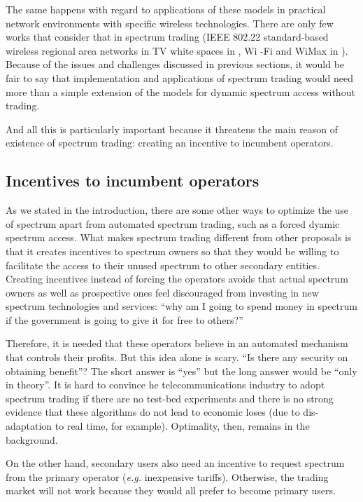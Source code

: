 The same happens with regard to applications of these models in practical network environments with specific wireless technologies. 
There are only few works that consider that in spectrum trading (IEEE 802.22 standard-based wireless regional area networks in TV white spaces in \cite{ref:Niyato2010}, Wi -Fi and WiMax in \cite{ref:802}).
Because of the issues and challenges discussed in previous sections, it would be fair to say that implementation and applications of spectrum trading would need more than a simple extension of the models for dynamic spectrum access without trading.

And all this is particularly important because it threatens the main reason of existence of spectrum trading: creating an incentive to incumbent operators.

\subsection{Incentives to incumbent operators}
As we stated in the introduction, there are some other ways to optimize the use of spectrum apart from automated spectrum trading, such as a forced dyamic spectrum access. What makes spectrum trading different from other proposals is that it creates incentives to spectrum owners so that they would be willing to facilitate the access to their unused spectrum to other secondary entities. 
Creating incentives instead of forcing the operators avoids that actual spectrum owners as well as prospective ones feel discouraged from investing in new spectrum technologies and services: ``why am I going to spend money in spectrum if the government is going to give it for free to others?''

Therefore, it is needed that these operators believe in an automated mechanism that controls their profits. 
But this idea alone is scary. ``Is there any security on obtaining benefit''? The short answer is ``yes'' but the long answer would be ``only in theory''. 
It is hard to convince he telecommunications industry to adopt spectrum trading if there are no test-bed experiments and there is no strong evidence that these algorithms do not lead to economic loses (due to dis-adaptation to real time, for example). Optimality, then, remains in the background. 

On the other hand, secondary users also need an incentive to request spectrum from the primary operator (\textit{e.g.} inexpensive tariffs). Otherwise, the trading market will not work because they would all prefer to become primary users. 

